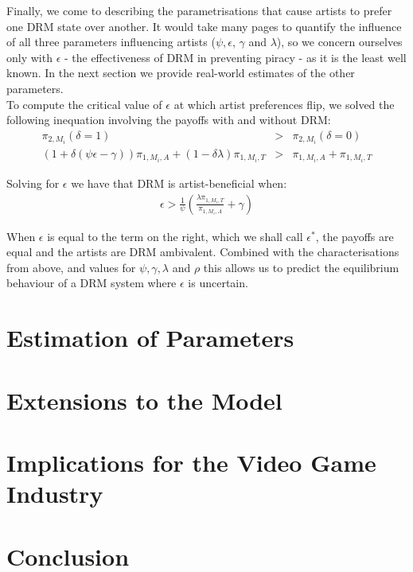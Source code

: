 \documentclass[a4paper,12pt]{article}
\numberwithin{equation}{section}
\newcommand{\artistpayoff}[2]{\pi_{#1, M_{#2}}}
\newcommand{\artistalbum}[2]{\pi_{#1, M_{#2}, A}}
\newcommand{\artistticket}[2]{\pi_{#1, M_{#2}, T}}
\newcommand{\drminf}{(\psi \epsilon - \gamma)}
\begin{document}
Finally, we come to describing the parametrisations that cause artists to prefer one DRM state over another. It would take many pages to quantify the influence of all three parameters influencing artists ($\psi, \epsilon$, $\gamma$ and $\lambda$), so we concern ourselves only with $\epsilon$ - the effectiveness of DRM in preventing piracy - as it is the least well known. In the next section we provide real-world estimates of the other parameters.\\

To compute the critical value of $\epsilon$ at which artist preferences flip, we solved the following inequation involving the payoffs with and without DRM:
\begin{eqnarray*}
\artistpayoff{2}{i}(\delta = 1) & > & \artistpayoff{2}{i}(\delta = 0)\\
(1 + \delta \drminf) \artistalbum{1}{i} + (1 - \delta \lambda) \artistticket{1}{i} & > & \artistalbum{1}{i} + \artistticket{1}{i}
\end{eqnarray*}

Solving for $\epsilon$ we have that DRM is artist-beneficial when:
\begin{eqnarray}
\epsilon > \frac{1}{\psi} \left( \frac{\lambda \artistticket{1}{i}}{\artistalbum{1}{i}} + \gamma \right)
\end{eqnarray}

When $\epsilon$ is equal to the term on the right, which we shall call $\epsilon^*$, the payoffs are equal and the artists are DRM ambivalent. Combined with the characterisations from above, and values for $\psi, \gamma, \lambda$ and $\rho$ this allows us to predict the equilibrium behaviour of a DRM system where $\epsilon$ is uncertain.

\pagebreak
\section{Estimation of Parameters}

\section{Extensions to the Model}

\section{Implications for the Video Game Industry}

\section{Conclusion}



\end{document}
